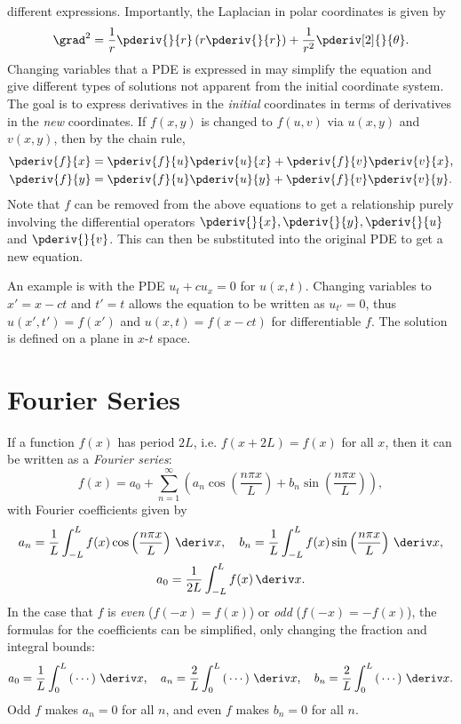 \documentclass[10pt, a4paper]{article}
\begin{document}
\begin{landscape}
\begin{multicols}{2}
    different expressions. Importantly, the Laplacian in polar coordinates is given by
    \[
        \grad^2 = \frac{1}{r} \pderiv{}{r} \left(r \pderiv{}{r}\right) + \frac{1}{r^2} \pderiv[2]{}{\theta}.
    \]
    Changing variables that a PDE is expressed in may simplify the equation and give different
    types of solutions not apparent from the initial coordinate system.
    The goal is to express derivatives in the \emph{initial} coordinates in terms of
    derivatives in the \emph{new} coordinates. If \(f(x, y)\) is changed to \(f(u, v)\) via
    \(u(x, y)\) and \(v(x, y)\), then by the chain rule,
    \begin{align*}
        \pderiv{f}{x} &= \pderiv{f}{u} \pderiv{u}{x} + \pderiv{f}{v} \pderiv{v}{x}, \\
        \pderiv{f}{y} &= \pderiv{f}{u} \pderiv{u}{y} + \pderiv{f}{v} \pderiv{v}{y}.
    \end{align*}
    Note that \(f\) can be removed from the above equations to get a relationship purely involving
    the differential operators \(\pderiv{}{x}, \pderiv{}{y}, \pderiv{}{u}\) and \(\pderiv{}{v}\).
    This can then be substituted into the original PDE to get a new equation.

    An example is with the PDE \(u_t + c u_x = 0\) for \(u(x, t)\). Changing variables to
    \(x' = x - ct\) and \(t' = t\) allows the equation to be written as \(u_{t'} = 0\), thus
    \(u(x', t') = f(x')\) and \(u(x, t) = f(x-ct)\) for differentiable \(f\). The solution is
    defined on a plane in \(x\)-\(t\) space.
    
    \section{Fourier Series}

    If a function \(f(x)\) has period \(2L\), i.e. \(f(x + 2L) = f(x)\) for all \(x\), then
    it can be written as a \emph{Fourier series}:
    \[
        f(x)
        = a_0 + \sum_{n=1}^{\infty} \left(
            a_n \cos\left(\frac{n \pi x}{L}\right)
            + b_n \sin\left(\frac{n \pi x}{L}\right)
        \right),
    \]
    with Fourier coefficients given by
    \begin{gather*}
        a_n = \frac{1}{L} \int_{-L}^{L} f(x) \cos\left(\frac{n \pi x}{L}\right) \,\deriv x,
        \quad
        b_n = \frac{1}{L} \int_{-L}^{L} f(x) \sin\left(\frac{n \pi x}{L}\right) \,\deriv x, \\
        a_0 = \frac{1}{2L} \int_{-L}^{L} f(x) \,\deriv x.
    \end{gather*}
    In the case that \(f\) is \emph{even} (\(f(-x) = f(x)\)) or \emph{odd} (\(f(-x) = -f(x)\)), the formulas for
    the coefficients can be simplified, only changing the fraction and integral bounds:
    \[
        a_0 = \frac{1}{L} \int_0^L \left(\,\cdots\right) \,\deriv x,
        \quad
        a_n = \frac{2}{L} \int_0^L \left(\,\cdots\right) \,\deriv x,
        \quad
        b_n = \frac{2}{L} \int_0^L \left(\,\cdots\right) \,\deriv x.
    \]
    Odd \(f\) makes \(a_n = 0\) for all \(n\), and even \(f\) makes \(b_n = 0\) for all \(n\).


\end{multicols}
\end{landscape}
\end{document}
